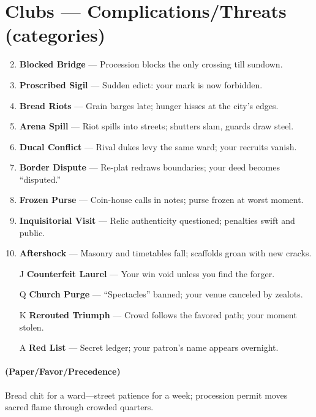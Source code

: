 \section*{Clubs --- Complications/Threats (categories)}
\label{sec:ecktoria-complications}
\begin{enumerate}
\setcounter{enumi}{1}
\item \textbf{Blocked Bridge} --- Procession blocks the only crossing till sundown.
\item \textbf{Proscribed Sigil} --- Sudden edict: your mark is now forbidden.
\item \textbf{Bread Riots} --- Grain barges late; hunger hisses at the city's edges.
\item \textbf{Arena Spill} --- Riot spills into streets; shutters slam, guards draw steel.
\item \textbf{Ducal Conflict} --- Rival dukes levy the same ward; your recruits vanish.
\item \textbf{Border Dispute} --- Re-plat redraws boundaries; your deed becomes ``disputed.''
\item \textbf{Frozen Purse} --- Coin-house calls in notes; purse frozen at worst moment.
\item \textbf{Inquisitorial Visit} --- Relic authenticity questioned; penalties swift and public.
\item \textbf{Aftershock} --- Masonry and timetables fall; scaffolds groan with new cracks.
\item[J] \textbf{Counterfeit Laurel} --- Your win void unless you find the forger.
\item[Q] \textbf{Church Purge} --- ``Spectacles'' banned; your venue canceled by zealots.
\item[K] \textbf{Rerouted Triumph} --- Crowd follows the favored path; your moment stolen.
\item[A] \textbf{Red List} --- Secret ledger; your patron's name appears overnight.
\end{enumerate}

\paragraph*{(Paper/Favor/Precedence)} Bread chit for a ward---street patience for a week; procession permit moves sacred flame through crowded quarters.

